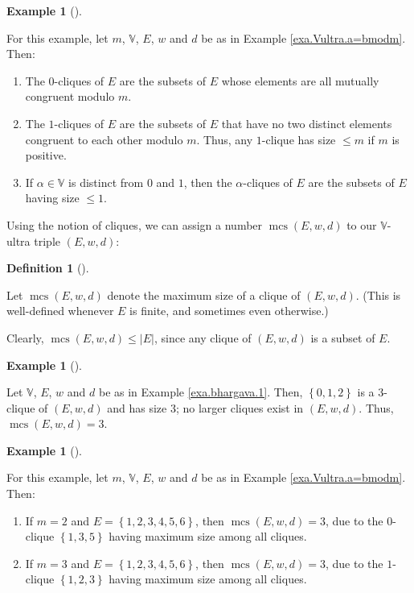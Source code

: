 \documentclass[numbers=enddot,12pt,final,onecolumn,notitlepage]{scrartcl}%
\theoremstyle{definition}
\newtheorem{defi}[theo]{Definition}
\newenvironment{definition}[1][]
{\begin{defi}[#1]\begin{leftbar}}
{\end{leftbar}\end{defi}}
\newtheorem{exam}[theo]{Example}
\newenvironment{example}[1][]
{\begin{exam}[#1]\begin{leftbar}}
{\end{leftbar}\end{exam}}
\renewcommand{\leq}{\leqslant}
\theoremstyle{plainsl}
\begin{document}
\begin{example}
For this example, let $m$, $\mathbb{V}$, $E$, $w$ and $d$ be as in Example
\ref{exa.Vultra.a=bmodm}. Then:

\begin{enumerate}
\item[\textbf{(a)}] The $0$-cliques of $E$ are the subsets of $E$ whose
elements are all mutually congruent modulo $m$.

\item[\textbf{(b)}] The $1$-cliques of $E$ are the subsets of $E$ that have no
two distinct elements congruent to each other modulo $m$. Thus, any $1$-clique
has size $\leq m$ if $m$ is positive.

\item[\textbf{(c)}] If $\alpha\in\mathbb{V}$ is distinct from $0$ and $1$,
then the $\alpha$-cliques of $E$ are the subsets of $E$ having size $\leq1$.
\end{enumerate}
\end{example}

Using the notion of cliques, we can assign a number $\operatorname*{mcs}%
\left(  E,w,d\right)  $ to our $\mathbb{V}$-ultra triple $\left(
E,w,d\right)  $:

\begin{definition}
\label{def.mcs}Let $\operatorname*{mcs}\left(  E,w,d\right)  $ denote the
maximum size of a clique of $\left(  E,w,d\right)  $. (This is well-defined
whenever $E$ is finite, and sometimes even otherwise.)
\end{definition}

Clearly, $\operatorname*{mcs}\left(  E,w,d\right)  \leq\left\vert E\right\vert
$, since any clique of $\left(  E,w,d\right)  $ is a subset of $E$.

\begin{example}
\label{exa.bhargava.mcs.1}Let $\mathbb{V}$, $E$, $w$ and $d$ be as in Example
\ref{exa.bhargava.1}. Then, $\left\{  0,1,2\right\}  $ is a $3$-clique of
$\left(  E,w,d\right)  $ and has size $3$; no larger cliques exist in $\left(
E,w,d\right)  $. Thus, $\operatorname*{mcs}\left(  E,w,d\right)  =3$.
\end{example}

\begin{example}
For this example, let $m$, $\mathbb{V}$, $E$, $w$ and $d$ be as in Example
\ref{exa.Vultra.a=bmodm}. Then:

\begin{enumerate}
\item[\textbf{(a)}] If $m=2$ and $E=\left\{  1,2,3,4,5,6\right\}  $, then
$\operatorname*{mcs}\left(  E,w,d\right)  =3$, due to the $0$-clique $\left\{
1,3,5\right\}  $ having maximum size among all cliques.

\item[\textbf{(b)}] If $m=3$ and $E=\left\{  1,2,3,4,5,6\right\}  $, then
$\operatorname*{mcs}\left(  E,w,d\right)  =3$, due to the $1$-clique $\left\{
1,2,3\right\}  $ having maximum size among all cliques.
\end{enumerate}
\end{example}
\end{document}

